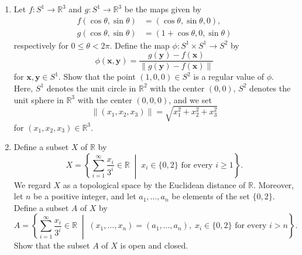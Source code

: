 \documentclass{article}
\begin{document}
\begin{enumerate}[label=\fbox{\arabic*}]
  \item Let $f : S^1 \to \mathbb{R}^3$ and $g : S^1 \to \mathbb{R}^3$ be the maps given by
        \begin{align*}
          f(\cos \theta, \sin \theta) & = (\cos \theta, \sin \theta, 0),    \\
          g(\cos \theta, \sin \theta) & = (1 + \cos \theta, 0, \sin \theta)
        \end{align*}
        respectively for $0 \le \theta < 2\pi$. Define the map $\phi : S^1 \times S^1 \to S^2$ by
        \[
          \phi(\boldsymbol{x}, \boldsymbol{y}) = \frac{g(\boldsymbol{y}) - f(\boldsymbol{x})}{\|g(\boldsymbol{y}) - f(\boldsymbol{x})\|}
        \]
        for $\boldsymbol{x}, \boldsymbol{y} \in S^1$. Show that the point $(1, 0, 0) \in S^2$ is a regular value of $\phi$. Here, $S^1$ denotes the unit circle in $\mathbb{R}^2$ with the center $(0, 0)$, $S^2$ denotes the unit sphere in $\mathbb{R}^3$ with the center $(0, 0, 0)$, and we set
        \[
          \|(x_1, x_2, x_3)\| = \sqrt{x_1^2 + x_2^2 + x_3^2}
        \]
        for $(x_1, x_2, x_3) \in \mathbb{R}^3$.

  \item Define a subset $X$ of $\mathbb{R}$ by
        \[
          X = \left\{ \sum_{i=1}^\infty \frac{x_i}{3^i} \in \mathbb{R} \;\middle|\; x_i \in \{0, 2\} \text{ for every } i \ge 1 \right\}.
        \]
        We regard $X$ as a topological space by the Euclidean distance of $\mathbb{R}$. Moreover, let $n$ be a positive integer, and let $a_1, \dots, a_n$ be elements of the set $\{0, 2\}$. Define a subset $A$ of $X$ by
        \[
          A = \left\{ \sum_{i=1}^\infty \frac{x_i}{3^i} \in \mathbb{R} \;\middle|\; (x_1, \dots, x_n) = (a_1, \dots, a_n),\; x_i \in \{0, 2\} \text{ for every } i > n \right\}.
        \]
        Show that the subset $A$ of $X$ is open and closed.

\end{enumerate}

\newpage

\end{document}
